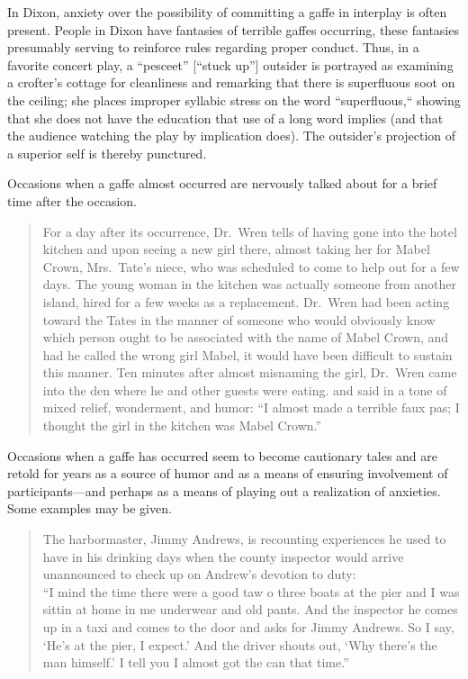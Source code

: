 \documentclass[openany,nobib]{tufte-book}
\begin{document}
In Dixon, anxiety over the possibility of committing a gaffe in
interplay is often present. People in Dixon have fantasies of terrible
gaffes occurring, these fantasies presumably serving to reinforce rules
regarding proper conduct. Thus, in a favorite concert play, a
``pesceet'' {[}``stuck up''{]} outsider is portrayed as examining a
crofter's cottage for cleanliness and remarking that there is
superfluous soot on the ceiling; she places improper syllabic stress on
the word ``superfluous,`` showing that she does not have the education
that use of a long word implies (and that the audience watching the play
by implication does). The outsider's projection of a superior self is
thereby punctured.

Occasions when a gaffe almost occurred are nervously talked about for a
brief time after the occasion.

\begin{quote}
For a day after its occurrence, Dr.~Wren tells of having gone into the
hotel kitchen and upon seeing a new girl there, almost taking her for
Mabel Crown, Mrs.~Tate's niece, who was scheduled to come to help out
for a few days. The young woman in the kitchen was actually someone from
another island, hired for a few weeks as a replacement. Dr.~Wren had
been acting toward the Tates in the manner of someone who would
obviously know which person ought to be associated with the name of
Mabel Crown, and had he called the wrong girl Mabel, it would have been
difficult to sustain this manner. Ten minutes after almost misnaming the
girl, Dr.~Wren came into the den where he and other guests were eating.
and said in a tone of mixed relief, wonderment, and humor: ``I almost
made a terrible faux pas; I thought the girl in the kitchen was Mabel
Crown.''
\end{quote}

\noindent Occasions when a gaffe has occurred seem to become cautionary tales and
are retold for years as a source of humor and as a means of ensuring
involvement of participants---and perhaps as a means of playing out a
realization of anxieties. Some examples may be given.

\begin{quote}
The harbormaster, Jimmy Andrews, is recounting experiences he used to
have in his drinking days when the county inspector would arrive
unannounced to check up on Andrew's devotion to duty:\\
``I mind the time there were a good taw o three boats at the pier and I
was sittin at home in me underwear and old pants. And the inspector he
comes up in a taxi and comes to the door and asks for Jimmy Andrews. So
I say, `He's at the pier, I expect.' And the driver shouts out, `Why
there's the man himself.' I tell you I almost got the can that time.''
\end{quote}
\end{document}
